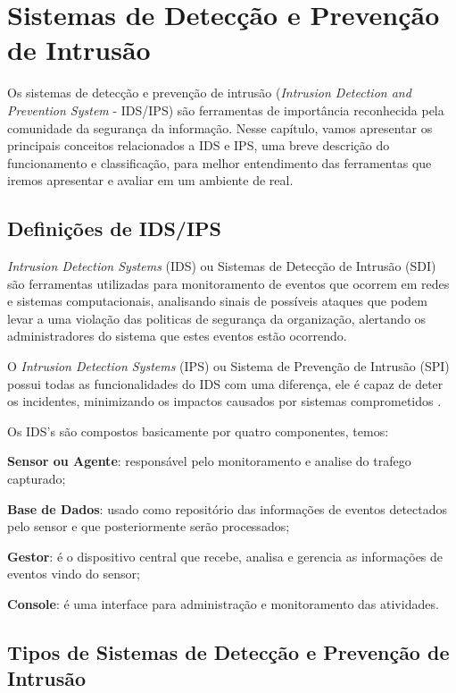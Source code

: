 \chapter{Sistemas de Detecção e Prevenção de Intrusão} \label{ch:idps}

Os sistemas de detecção e prevenção de intrusão (\textit{Intrusion Detection and Prevention System} - IDS/IPS) são ferramentas de importância reconhecida pela comunidade da segurança da informação. Nesse capítulo, vamos apresentar os principais conceitos relacionados a IDS e IPS, uma breve descrição do funcionamento e classificação, para melhor entendimento das ferramentas que iremos apresentar e avaliar em um ambiente de real.

\section{Definições de IDS/IPS} \label{sec:ipds-definicoes}

\textit{Intrusion Detection Systems} (IDS) ou Sistemas de Detecção de Intrusão (SDI) são ferramentas utilizadas para monitoramento de eventos que ocorrem em redes e sistemas computacionais, analisando sinais de possíveis ataques que podem levar a uma violação das politicas de segurança da organização, alertando os administradores do sistema que estes eventos estão ocorrendo. 

O \textit{Intrusion Detection Systems} (IPS) ou Sistema de Prevenção de Intrusão (SPI) possui todas as funcionalidades do IDS com uma diferença, ele é capaz de deter os incidentes, minimizando os impactos causados por sistemas comprometidos \cite{mukhopadhyay01}.

Os IDS's são compostos basicamente por quatro componentes, temos: 
\begin{alineas}
\item \textbf{Sensor ou Agente}: responsável pelo monitoramento e analise do trafego capturado; 
\item \textbf{Base de Dados}: usado como repositório das informações de eventos detectados pelo sensor e que posteriormente serão processados;
\item \textbf{Gestor}: é o dispositivo central que recebe, analisa e gerencia as informações de eventos vindo do sensor; 
\item \textbf{Console}: é uma interface para administração e monitoramento das atividades.
\end{alineas}

\section{Tipos de Sistemas de Detecção e Prevenção de Intrusão} \label{sec:idps-tipos}

